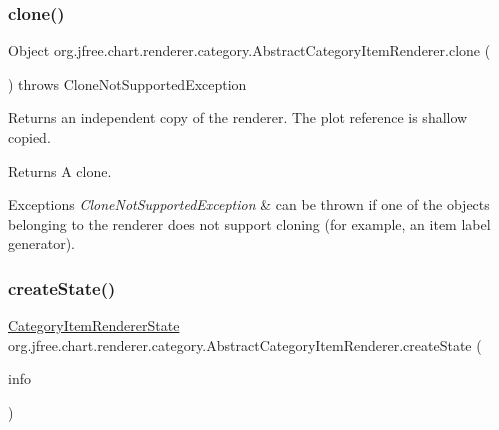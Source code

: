 \subsubsection{\texorpdfstring{clone()}{clone()}}
{\footnotesize\ttfamily Object org.\+jfree.\+chart.\+renderer.\+category.\+Abstract\+Category\+Item\+Renderer.\+clone (\begin{DoxyParamCaption}{ }\end{DoxyParamCaption}) throws Clone\+Not\+Supported\+Exception}

Returns an independent copy of the renderer. The {\ttfamily plot} reference is shallow copied.

\begin{DoxyReturn}{Returns}
A clone.
\end{DoxyReturn}

\begin{DoxyExceptions}{Exceptions}
{\em Clone\+Not\+Supported\+Exception} & can be thrown if one of the objects belonging to the renderer does not support cloning (for example, an item label generator). \\
\hline
\end{DoxyExceptions}
\mbox{\label{classorg_1_1jfree_1_1chart_1_1renderer_1_1category_1_1_abstract_category_item_renderer_af6ad3482f91eae74b4ab24de4d9e7151}} 
\subsubsection{\texorpdfstring{create\+State()}{createState()}}
{\footnotesize\ttfamily \mbox{\hyperlink{classorg_1_1jfree_1_1chart_1_1renderer_1_1category_1_1_category_item_renderer_state}{Category\+Item\+Renderer\+State}} org.\+jfree.\+chart.\+renderer.\+category.\+Abstract\+Category\+Item\+Renderer.\+create\+State (\begin{DoxyParamCaption}\item[{\mbox{\hyperlink{classorg_1_1jfree_1_1chart_1_1plot_1_1_plot_rendering_info}{Plot\+Rendering\+Info}}}]{info }\end{DoxyParamCaption})\hspace{0.3cm}{\ttfamily [protected]}}

